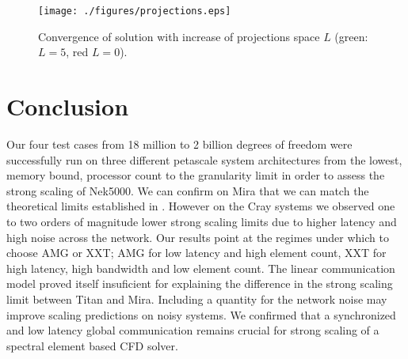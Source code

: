 \documentclass{sig-alternate}
\begin{document}
\begin{figure}
  \centering
  \texttt{[image: ./figures/projections.eps]}
  \caption{Convergence of solution with increase of projections space $L$ (green: $L=5$, red $L=0$).}
  \label{fig:projections}
\end{figure}


\section{Conclusion}
Our four test cases from 18 million to 2 billion degrees of freedom were
successfully run on three different petascale system architectures from the
lowest, memory bound, processor count to the granularity limit in order to
assess the strong scaling of Nek5000. We can confirm on Mira that  we can match the theoretical limits established in \cite{fischer:scaling}. However on the Cray systems we observed one to two orders of magnitude
lower strong scaling limits due to higher
latency and high noise across the network. %
Our results point at the regimes under which to choose AMG or
XXT; AMG for low latency and high element count, XXT for high latency, high
bandwidth and low element count. The linear communication model proved itself insuficient for explaining the difference in
the strong scaling limit between Titan and Mira. Including a 
quantity for the network noise may improve scaling predictions on noisy systems.
We confirmed that a synchronized and low latency global communication remains crucial for strong scaling of a spectral element based CFD solver.

\end{document}
